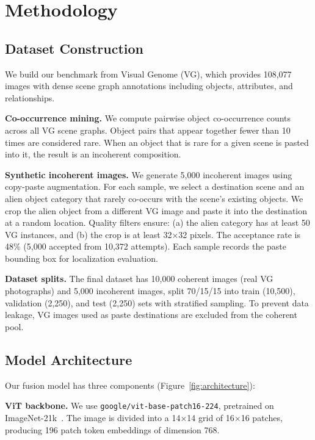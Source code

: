 \documentclass[conference]{IEEEtran}
\begin{document}
\section{Methodology}

\subsection{Dataset Construction}

We build our benchmark from Visual Genome (VG), which provides 108,077 images with dense scene graph annotations including objects, attributes, and relationships.

\textbf{Co-occurrence mining.} We compute pairwise object co-occurrence counts across all VG scene graphs. Object pairs that appear together fewer than 10 times are considered rare. When an object that is rare for a given scene is pasted into it, the result is an incoherent composition.

\textbf{Synthetic incoherent images.} We generate 5,000 incoherent images using copy-paste augmentation. For each sample, we select a destination scene and an alien object category that rarely co-occurs with the scene's existing objects. We crop the alien object from a different VG image and paste it into the destination at a random location. Quality filters ensure: (a) the alien category has at least 50 VG instances, and (b) the crop is at least 32$\times$32 pixels. The acceptance rate is 48\% (5,000 accepted from 10,372 attempts). Each sample records the paste bounding box for localization evaluation.

\textbf{Dataset splits.} The final dataset has 10,000 coherent images (real VG photographs) and 5,000 incoherent images, split 70/15/15 into train (10,500), validation (2,250), and test (2,250) sets with stratified sampling. To prevent data leakage, VG images used as paste destinations are excluded from the coherent pool.

\subsection{Model Architecture}

Our fusion model has three components (Figure~\ref{fig:architecture}):

\textbf{ViT backbone.} We use \texttt{google/vit-base-patch16-224}, pretrained on ImageNet-21k~\cite{dosovitskiy2020image}. The image is divided into a 14$\times$14 grid of 16$\times$16 patches, producing 196 patch token embeddings of dimension 768.
\end{document}
